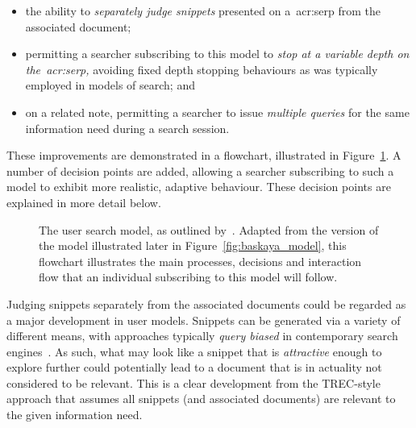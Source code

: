 \begin{itemize}
    \item{the ability to \emph{separately judge snippets} presented on a~\gls{acr:serp} from the associated document;}
    \item{permitting a searcher subscribing to this model to \emph{stop at a variable depth on the~\gls{acr:serp},} avoiding fixed depth stopping behaviours as was typically employed in models of search; and}
    \item{on a related note, permitting a searcher to issue \emph{multiple queries} for the same information need during a search session.}
\end{itemize}

These improvements are demonstrated in a flowchart, illustrated in Figure~\ref{fig:baskaya_model_flow}. A number of decision points are added, allowing a searcher subscribing to such a model to exhibit more realistic, adaptive behaviour. These decision points are explained in more detail below.

\begin{figure}[t!]
    \centering
    \caption[Flowchart of the search process by~\cite{baskaya2013behavioural_factors}]{The user search model, as outlined by~\cite{baskaya2013behavioural_factors}. Adapted from the version of the model illustrated later in Figure~\ref{fig:baskaya_model}, this flowchart illustrates the main processes, decisions and interaction flow that an individual subscribing to this model will follow.}
    \label{fig:baskaya_model_flow}
\end{figure}

Judging snippets separately from the associated documents could be regarded as a major development in user models. Snippets can be generated via a variety of different means, with approaches typically \emph{query biased} in contemporary search engines~\citep{tombros1998query_biased}. As such, what may look like a snippet that is \emph{attractive} enough to explore further could potentially lead to a document that is in actuality not considered to be relevant. This is a clear development from the TREC-style approach that assumes all snippets (and associated documents) are relevant to the given information need.

